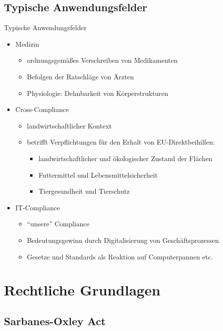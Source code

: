 \documentclass[xcolor={usenames,dvipsnames}, compress, 10pt]{beamer}
\begin{document}
\subsection*{Typische Anwendungsfelder}

\begin{frame}{Typische Anwendungsfelder}
\pause
\begin{itemize}[<+->]
	\item Medizin
		\begin{itemize}[<+->]
			\item ordnungsgem\"a{\ss}es Verschreiben von Medikamenten
			\item Befolgen der Ratschl\"age von \"Arzten
			\item Physiologie: Dehnbarkeit von K\"orperstrukturen
		\end{itemize}
	\item Cross-Compliance
		\begin{itemize}[<+->]
			\item landwirtschaftlicher Kontext
			\item betrifft Verpflichtungen f\"ur den Erhalt von EU-Direktbeihilfen:
				\begin{itemize}[<+->]
					\item landwirtschaftlicher und \"okologischer Zustand der Fl\"achen
					\item Futtermittel und Lebensmittelsicherheit
					\item Tiergesundheit und Tierschutz
				\end{itemize}
		\end{itemize}
	\item IT-Compliance
	\begin{itemize}[<+->]
		\item "`unsere"' Compliance
		\item Bedeutungsgewinn durch Digitalisierung von Gesch\"aftsprozessen
		\item Gesetze und Standards als Reaktion auf Computerpannen etc.
	\end{itemize}
\end{itemize}
\end{frame}

\section{Rechtliche Grundlagen}
\subsection*{Sarbanes-Oxley Act}
\end{document}
